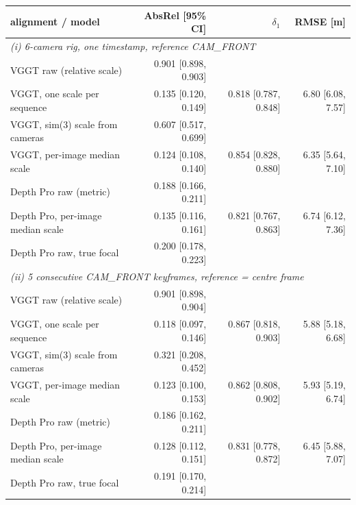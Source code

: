 \footnotesize\renewcommand{\arraystretch}{0.92}
\begin{tabular}{lrrr}
\toprule
alignment / model & AbsRel [95\% CI] & $\delta_1$ & RMSE [m] \\
\midrule
\multicolumn{4}{l}{\emph{(i) 6-camera rig, one timestamp, reference CAM\_FRONT}} \\
VGGT raw (relative scale) & 0.901 [0.898, 0.903] &  &  \\
VGGT, one scale per sequence & 0.135 [0.120, 0.149] & 0.818 [0.787, 0.848] & 6.80 [6.08, 7.57] \\
VGGT, sim(3) scale from cameras & 0.607 [0.517, 0.699] &  &  \\
VGGT, per-image median scale & 0.124 [0.108, 0.140] & 0.854 [0.828, 0.880] & 6.35 [5.64, 7.10] \\
Depth Pro raw (metric) & 0.188 [0.166, 0.211] &  &  \\
Depth Pro, per-image median scale & 0.135 [0.116, 0.161] & 0.821 [0.767, 0.863] & 6.74 [6.12, 7.36] \\
Depth Pro raw, true focal & 0.200 [0.178, 0.223] &  &  \\
\midrule
\multicolumn{4}{l}{\emph{(ii) 5 consecutive CAM\_FRONT keyframes, reference = centre frame}} \\
VGGT raw (relative scale) & 0.901 [0.898, 0.904] &  &  \\
VGGT, one scale per sequence & 0.118 [0.097, 0.146] & 0.867 [0.818, 0.903] & 5.88 [5.18, 6.68] \\
VGGT, sim(3) scale from cameras & 0.321 [0.208, 0.452] &  &  \\
VGGT, per-image median scale & 0.123 [0.100, 0.153] & 0.862 [0.808, 0.902] & 5.93 [5.19, 6.74] \\
Depth Pro raw (metric) & 0.186 [0.162, 0.211] &  &  \\
Depth Pro, per-image median scale & 0.128 [0.112, 0.151] & 0.831 [0.778, 0.872] & 6.45 [5.88, 7.07] \\
Depth Pro raw, true focal & 0.191 [0.170, 0.214] &  &  \\
\bottomrule
\end{tabular}
